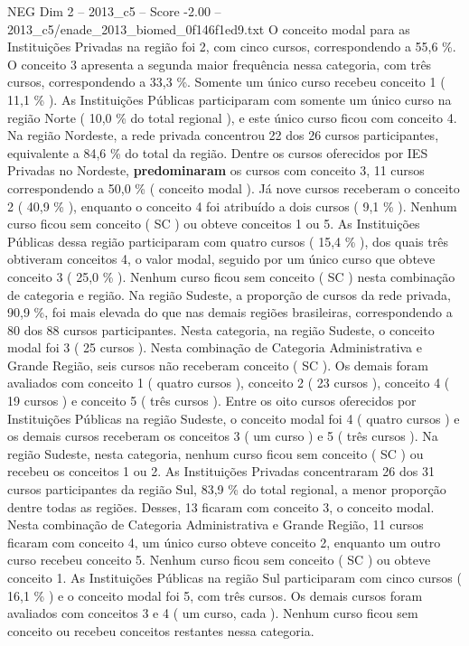 \begin{textsample}{NEG Dim 2 – 2013\_c5 – Score -2.00 – 2013\_c5/enade\_2013\_biomed\_0f146f1ed9.txt}
O conceito modal para as Instituições Privadas na região foi 2, com cinco cursos, correspondendo a 55,6 \%.
O conceito 3 apresenta a segunda maior frequência nessa categoria, com três cursos, correspondendo a 33,3 \%.
Somente um único curso recebeu conceito 1 ( 11,1 \% ).
As Instituições Públicas participaram com somente um único curso na região Norte ( 10,0 \% do total regional ), e este único curso ficou com conceito 4.
Na região Nordeste, a rede privada concentrou 22 dos 26 cursos participantes, equivalente a 84,6 \% do total da região.
Dentre os cursos oferecidos por IES Privadas no Nordeste, \textbf{predominaram} os cursos com conceito 3, 11 cursos correspondendo a 50,0 \% ( conceito modal ).
Já nove cursos receberam o conceito 2 ( 40,9 \% ), enquanto o conceito 4 foi atribuído a dois cursos ( 9,1 \% ).
Nenhum curso ficou sem conceito ( SC ) ou obteve conceitos 1 ou 5.
As Instituições Públicas dessa região participaram com quatro cursos ( 15,4 \% ), dos quais três obtiveram conceitos 4, o valor modal, seguido por um único curso que obteve conceito 3 ( 25,0 \% ).
Nenhum curso ficou sem conceito ( SC ) nesta combinação de categoria e região.
Na região Sudeste, a proporção de cursos da rede privada, 90,9 \%, foi mais elevada do que nas demais regiões brasileiras, correspondendo a 80 dos 88 cursos participantes.
Nesta categoria, na região Sudeste, o conceito modal foi 3 ( 25 cursos ).
Nesta combinação de Categoria Administrativa e Grande Região, seis cursos não receberam conceito ( SC ).
Os demais foram avaliados com conceito 1 ( quatro cursos ), conceito 2 ( 23 cursos ), conceito 4 ( 19 cursos ) e conceito 5 ( três cursos ).
Entre os oito cursos oferecidos por Instituições Públicas na região Sudeste, o conceito modal foi 4 ( quatro cursos ) e os demais cursos receberam os conceitos 3 ( um curso ) e 5 ( três cursos ).
Na região Sudeste, nesta categoria, nenhum curso ficou sem conceito ( SC ) ou recebeu os conceitos 1 ou 2.
As Instituições Privadas concentraram 26 dos 31 cursos participantes da região Sul, 83,9 \% do total regional, a menor proporção dentre todas as regiões.
Desses, 13 ficaram com conceito 3, o conceito modal.
Nesta combinação de Categoria Administrativa e Grande Região, 11 cursos ficaram com conceito 4, um único curso obteve conceito 2, enquanto um outro curso recebeu conceito 5.
Nenhum curso ficou sem conceito ( SC ) ou obteve conceito 1.
As Instituições Públicas na região Sul participaram com cinco cursos ( 16,1 \% ) e o conceito modal foi 5, com três cursos.
Os demais cursos foram avaliados com conceitos 3 e 4 ( um curso, cada ).
Nenhum curso ficou sem conceito ou recebeu conceitos restantes nessa categoria.

\end{textsample}
